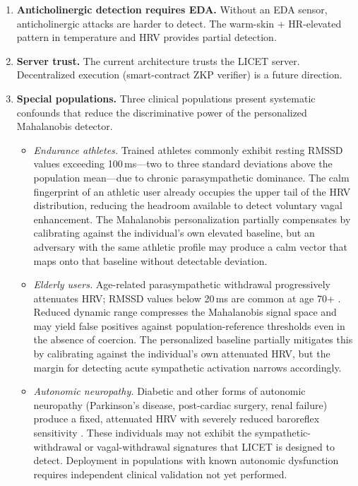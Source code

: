 \documentclass[12pt,a4paper]{article}
\begin{document}
\begin{enumerate}
  \item \textbf{Anticholinergic detection requires EDA.} Without an EDA
  sensor, anticholinergic attacks are harder to detect. The warm-skin +
  HR-elevated pattern in temperature and HRV provides partial detection.

  \item \textbf{Server trust.} The current architecture trusts the LICET
  server. Decentralized execution (smart-contract ZKP verifier) is a future
  direction.

  \item \textbf{Special populations.} Three clinical populations present
  systematic confounds that reduce the discriminative power of the personalized
  Mahalanobis detector.

  \begin{itemize}
    \item \emph{Endurance athletes.} Trained athletes commonly exhibit resting
    RMSSD values exceeding 100\,ms---two to three standard deviations above the
    population mean---due to chronic parasympathetic dominance. The calm
    fingerprint of an athletic user already occupies the upper tail of the HRV
    distribution, reducing the headroom available to detect voluntary vagal
    enhancement. The Mahalanobis personalization partially compensates by
    calibrating against the individual's own elevated baseline, but an adversary
    with the same athletic profile may produce a calm vector that maps onto that
    baseline without detectable deviation.

    \item \emph{Elderly users.} Age-related parasympathetic withdrawal
    progressively attenuates HRV; RMSSD values below 20\,ms are common at age
    70+ \cite{thayer2012hrv}. Reduced dynamic range compresses the Mahalanobis
    signal space and may yield false positives against population-reference
    thresholds even in the absence of coercion. The personalized baseline
    partially mitigates this by calibrating against the individual's own
    attenuated HRV, but the margin for detecting acute sympathetic activation
    narrows accordingly.

    \item \emph{Autonomic neuropathy.} Diabetic and other forms of autonomic
    neuropathy (Parkinson's disease, post-cardiac surgery, renal failure)
    produce a fixed, attenuated HRV with severely reduced baroreflex
    sensitivity \cite{moak2007lf}. These individuals may not exhibit the
    sympathetic-withdrawal or vagal-withdrawal signatures that LICET is
    designed to detect. Deployment in populations with known autonomic
    dysfunction requires independent clinical validation not yet performed.
  \end{itemize}
\end{enumerate}
\end{document}
